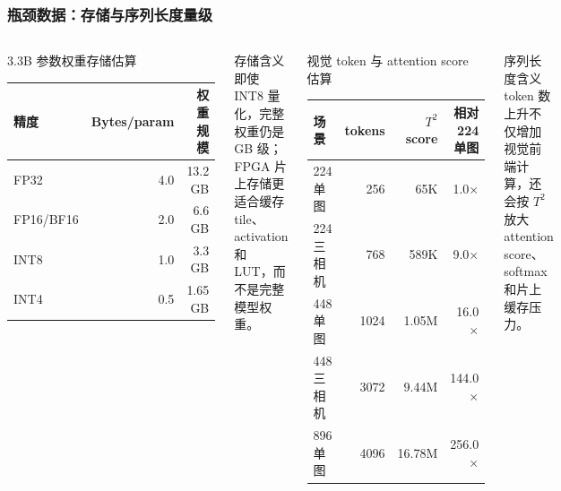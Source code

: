 \documentclass[10pt, aspectratio=169]{beamer}
\begin{document}
\begin{frame}
  \frametitle{瓶颈数据：存储与序列长度量级}
  \small
  \begin{columns}[T,onlytextwidth]
    \begin{block}{3.3B 参数权重存储估算}
      \centering
      \scriptsize
      \setlength{\tabcolsep}{5pt}
      \begin{tabular}{@{}lrr@{}}
        \toprule
        精度        & Bytes/param & 权重规模    \\
        \midrule
        FP32      & 4.0         & 13.2 GB \\
        FP16/BF16 & 2.0         & 6.6 GB  \\
        INT8      & 1.0         & 3.3 GB  \\
        INT4      & 0.5         & 1.65 GB \\
        \bottomrule
      \end{tabular}
    \end{block}

    \begin{alertblock}{存储含义}
      \footnotesize
      即使 INT8 量化，完整权重仍是 GB 级；FPGA 片上存储更适合缓存 tile、activation 和 LUT，而不是完整模型权重。
    \end{alertblock}

    \begin{block}{视觉 token 与 attention score 估算}
      \centering
      \scriptsize
      \setlength{\tabcolsep}{3pt}
      \begin{tabular}{@{}lrrr@{}}
        \toprule
        场景      & tokens & $T^2$ score & 相对 224 单图     \\
        \midrule
        224 单图  & 256    & 65K         & 1.0$\times$   \\
        224 三相机 & 768    & 589K        & 9.0$\times$   \\
        448 单图  & 1024   & 1.05M       & 16.0$\times$  \\
        448 三相机 & 3072   & 9.44M       & 144.0$\times$ \\
        896 单图  & 4096   & 16.78M      & 256.0$\times$ \\
        \bottomrule
      \end{tabular}
    \end{block}

    \begin{exampleblock}{序列长度含义}
      \footnotesize
      token 数上升不仅增加视觉前端计算，还会按 $T^2$ 放大 attention score、softmax 和片上缓存压力。
    \end{exampleblock}
  \end{columns}
\end{frame}
\end{document}
